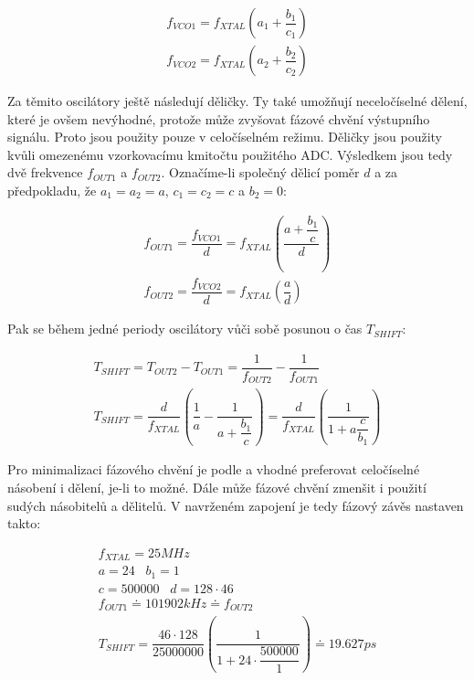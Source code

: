 \begin{equation}
\begin{gathered}
f_{VCO1}=f_{XTAL} \left(a_1+\dfrac{b_1}{c_1} \right) \\
f_{VCO2}=f_{XTAL} \left(a_2+\dfrac{b_2}{c_2} \right)
\end{gathered}
\end{equation}

Za těmito oscilátory ještě následují děličky. Ty také umožňují neceločíselné dělení, které je ovšem nevýhodné, protože může zvyšovat fázové chvění výstupního signálu. Proto jsou použity pouze v celočíselném režimu. Děličky jsou použity kvůli omezenému vzorkovacímu kmitočtu použitého \acrshort{ADC}. Výsledkem jsou tedy dvě frekvence $f_{OUT1}$ a $f_{OUT2}$. Označíme-li společný dělicí poměr $d$ a za předpokladu, že $a_1=a_2=a$, $c_1=c_2=c$ a $b_2=0$:

\begin{equation}
\begin{gathered}
f_{OUT1}=\dfrac{f_{VCO1}}{d}=f_{XTAL} \left(\dfrac{a+\dfrac{b_1}{c} }{d}\right) \\
f_{OUT2}=\dfrac{f_{VCO2}}{d}=f_{XTAL} \left(\dfrac{a}{d}\right)
\end{gathered}
\end{equation}

Pak se během jedné periody oscilátory vůči sobě posunou o čas $T_{SHIFT}$:

\begin{equation}
\begin{gathered}
T_{SHIFT}=T_{OUT2}-T_{OUT1}=\dfrac{1}{f_{OUT2}} - \dfrac{1}{f_{OUT1}} \\
T_{SHIFT}=\dfrac{d}{f_{XTAL}} \left(\dfrac{1}{a} - \dfrac{1}{a+\dfrac{b_1}{c}}\right) = \dfrac{d}{f_{XTAL}} \left(\dfrac{1}{1+a\dfrac{c}{b_1}}\right)
\end{gathered}
\end{equation}

Pro minimalizaci fázového chvění je podle \cite{Si5351datasheet} a \cite{Si5351applicationnote} vhodné preferovat celočíselné násobení i dělení, je-li to možné. Dále může fázové chvění zmenšit i použití sudých násobitelů a dělitelů. V navrženém zapojení je tedy fázový závěs nastaven takto:

\begin{equation}
\begin{gathered}
f_{XTAL}= 25 \si{MHz} \\
a=24 \;\;\; b_1=1 \\
c=500000 \;\;\; d=128 \cdot 46 \\
f_{OUT1} \doteq 101902 \si{kHz} \doteq f_{OUT2} \\
T_{SHIFT} = \dfrac{46 \cdot 128}{25000000} \left(\dfrac{1}{1+24 \cdot \dfrac{500000}{1}}\right) \doteq 19.627 \si{ps}
\end{gathered}
\end{equation}


